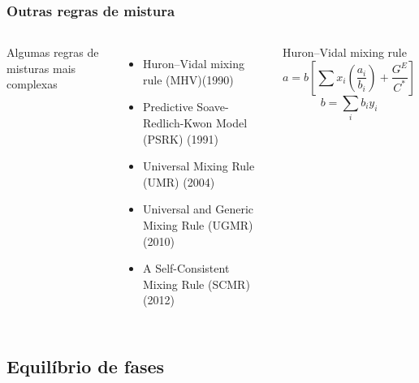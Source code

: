 \documentclass[aspectratio=169]{beamer}
\begin{document}
\begin{frame} 
	\frametitle{Outras regras de mistura}
		\begin{columns}[c]
	Algumas regras de misturas mais complexas
	\begin{itemize}
		\item Huron–Vidal mixing rule (MHV)(1990)
		\item Predictive Soave-Redlich-Kwon Model (PSRK) (1991)
		\item Universal Mixing Rule (UMR) (2004)
		\item Universal and Generic Mixing Rule (UGMR)(2010)
		\item A Self-Consistent Mixing Rule (SCMR)(2012)
	\end{itemize}
			\begin{block}{Huron–Vidal mixing rule}
			\begin{equation*}
			a = b \left[ \sum  x_i \left(\frac{a_i}{b_i} \right) + \frac{G^E}{C^*}
			\right] 
			\end{equation*}
			\begin{equation*}
			b = \sum_i{b_iy_i}
			\end{equation*}
			\end{block}
	\end{columns}
\end{frame}

\subsection*{Equilíbrio de fases}
\end{document}
